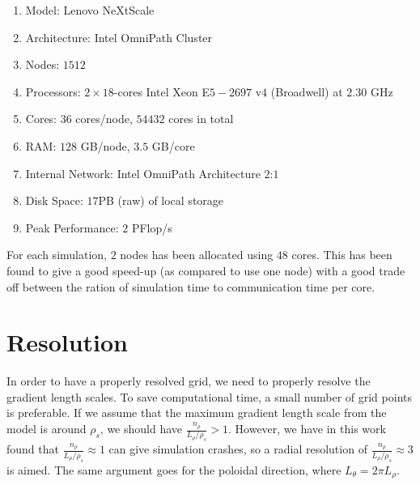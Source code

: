 \begin{enumerate}[noitemsep]
    \item Model: Lenovo NeXtScale
    \item Architecture: Intel OmniPath Cluster
    \item Nodes: $1512$
    \item Processors: $2\times18$-cores Intel Xeon E$5-2697$ v$4$ (Broadwell) at $2.30$ GHz
    \item Cores: $36$ cores/node, $54432$ cores in total
    \item RAM: $128$ GB/node, $3.5$ GB/core
    \item Internal Network: Intel OmniPath Architecture $2$:$1$
    \item Disk Space: $17$PB (raw) of local storage
    \item Peak Performance: $2$ PFlop/s
\end{enumerate}
%
For each simulation, $2$ nodes has been allocated using $48$ cores.
This has been found to give a good speed-up (as compared to use one node) with a good trade off between the ration of simulation time to communication time per core.

\section{Resolution}
\label{sec:resolution}
%
In order to have a properly resolved grid, we need to properly resolve the gradient length scales.
To save computational time, a small number of grid points is preferable.
If we assume that the maximum gradient length scale from the model is around $\rho_s$, we should have $\frac{n_\rho}{L_\rho/\rho_s}>1$.
However, we have in this work found that $\frac{n_\rho}{L_\rho/\rho_s}\approx1$ can give simulation crashes, so a radial resolution of $\frac{n_\rho}{L_\rho/\rho_s}\approx3$ is aimed.
The same argument goes for the poloidal direction, where $L_\theta=2\pi L_\rho$.

